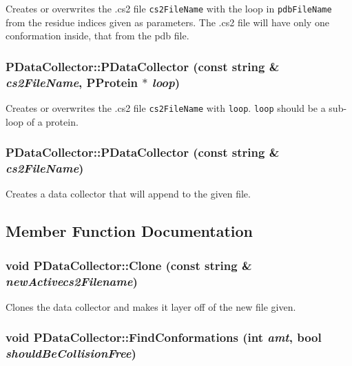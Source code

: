Creates or overwrites the .cs2 file {\tt cs2File\-Name} with the loop in {\tt pdb\-File\-Name} from the residue indices given as parameters. The .cs2 file will have only one conformation inside, that from the pdb file. 
\subsubsection{\setlength{\rightskip}{0pt plus 5cm}PData\-Collector::PData\-Collector (const string \& {\em cs2File\-Name}, {\bf PProtein} $\ast$ {\em loop})}\label{classPDataCollector_f3772a3d3efb0e47b9085d8e856546a0}


Creates or overwrites the .cs2 file {\tt cs2File\-Name} with {\tt loop}. {\tt loop} should be a sub-loop of a protein. 
\subsubsection{\setlength{\rightskip}{0pt plus 5cm}PData\-Collector::PData\-Collector (const string \& {\em cs2File\-Name})}\label{classPDataCollector_9abd3293037de8a985685aee03a9dc35}


Creates a data collector that will append to the given file. 

\subsection{Member Function Documentation}
\subsubsection{\setlength{\rightskip}{0pt plus 5cm}void PData\-Collector::Clone (const string \& {\em new\-Activecs2Filename})}\label{classPDataCollector_9d3597cbc54e88e0ca63ba0f6341eaab}


Clones the data collector and makes it layer off of the new file given. 
\subsubsection{\setlength{\rightskip}{0pt plus 5cm}void PData\-Collector::Find\-Conformations (int {\em amt}, bool {\em should\-Be\-Collision\-Free})}\label{classPDataCollector_d2a80aaea65346f9e3ff5648b85624fd}


